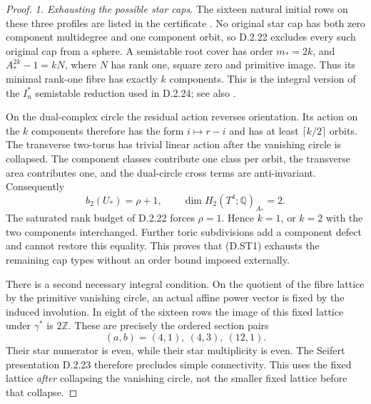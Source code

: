 \begin{proof}
\emph{1. Exhausting the possible star caps.}
The sixteen natural initial rows on these three profiles are
listed in the certificate
.
No original star cap has both zero component multidegree and one
component orbit, so D.2.22 excludes every such original cap from
a sphere. A semistable root cover has order $m_*=2k$, and
$A_*^{2k}-1=kN$, where $N$ has rank one, square zero and primitive
image. Thus its minimal rank-one fibre has exactly $k$ components.
This is the integral version of the $I_n^*$ semistable reduction
used in D.2.24; see also \cite[Sections 7.6--7.7]{manSS10}.

On the dual-complex circle the residual action reverses
orientation. Its action on the $k$ components therefore has the
form $i\mapsto r-i$ and has at least $\lceil k/2\rceil$ orbits.
The transverse two-torus has trivial linear action after the
vanishing circle is collapsed. The component classes contribute
one class per orbit, the transverse area contributes one, and
the dual-circle cross terms are anti-invariant. Consequently
\[
 b_2(U_*)=\rho+1,\qquad
 \dim H_2(T^4;\mathbb Q)_{A_*}=2.
\]
The saturated rank budget of D.2.22 forces $\rho=1$.
Hence $k=1$, or $k=2$ with the two components interchanged.
Further toric subdivisions add a component defect and cannot
restore this equality. This proves that (D.ST1) exhausts the
remaining cap types without an order bound imposed externally.

There is a second necessary integral condition. On the quotient
of the fibre lattice by the primitive vanishing circle, an
actual affine power vector is fixed by the induced involution.
In eight of the sixteen rows the image of this fixed lattice
under $\gamma^*$ is $2\mathbb Z$. These are precisely the ordered
section pairs
\[
 (a,b)=(4,1),\ (4,3),\ (12,1).
\]
Their star numerator is even, while their star multiplicity is
even. The Seifert presentation D.2.23 therefore precludes simple
connectivity. This uses the fixed lattice \emph{after} collapsing
the vanishing circle, not the smaller fixed lattice before that
collapse.


\end{proof}

